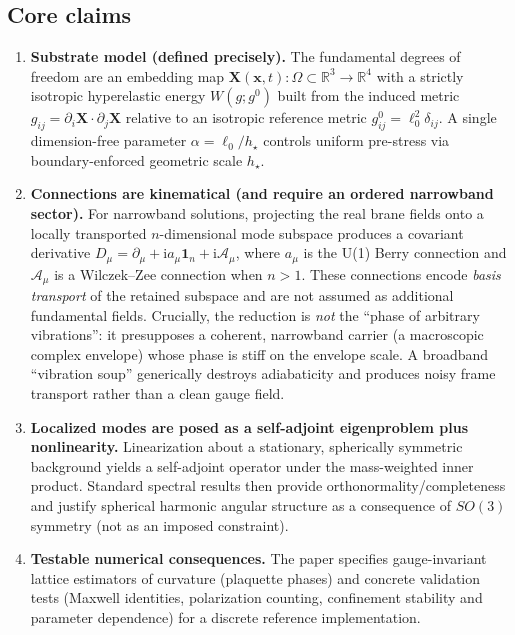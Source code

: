 \documentclass[11pt,a4paper]{article}
\providecommand{\ii}{\mathrm{i}}
\newcommand{\X}{\mathbf{X}}                 %
\newcommand{\x}{\mathbf{x}}                 %
\newcommand{\bbA}{\mathcal{A}}              %
\newcommand{\covD}{D}                       %
\begin{document}
\subsection*{Core claims}
\begin{enumerate}
  \item \textbf{Substrate model (defined precisely).} The fundamental degrees of freedom are an embedding map
        $\X(\x,t):\Omega\subset\mathbb{R}^3\to\mathbb{R}^4$ with a strictly isotropic hyperelastic energy
        $W(g;g^0)$ built from the induced metric $g_{ij}=\partial_i\X\cdot\partial_j\X$ relative to an isotropic
        reference metric $g^0_{ij}=\ell_0^2\delta_{ij}$. A single dimension-free parameter
        $\alpha=\ell_0/h_\star$ controls uniform pre-stress via boundary-enforced geometric scale $h_\star$.
  \item \textbf{Connections are kinematical (and require an ordered narrowband sector).} For narrowband solutions,
        projecting the real brane fields onto a locally transported $n$-dimensional mode subspace produces a covariant derivative
        $\covD_\mu=\partial_\mu+\ii a_\mu\mathbf{1}_n+\ii\bbA_\mu$, where $a_\mu$ is the U(1) Berry connection and
        $\bbA_\mu$ is a Wilczek--Zee connection when $n>1$. These connections encode \emph{basis transport} of the retained subspace
        and are not assumed as additional fundamental fields. Crucially, the reduction is \emph{not} the ``phase of arbitrary vibrations'':
        it presupposes a coherent, narrowband carrier (a macroscopic complex envelope) whose phase is stiff on the envelope scale.
        A broadband ``vibration soup'' generically destroys adiabaticity and produces noisy frame transport rather than a clean gauge field.
  \item \textbf{Localized modes are posed as a self-adjoint eigenproblem plus nonlinearity.} Linearization about a
        stationary, spherically symmetric background yields a self-adjoint operator under the mass-weighted
        inner product. Standard spectral results then provide orthonormality/completeness and justify spherical
        harmonic angular structure as a consequence of $SO(3)$ symmetry (not as an imposed constraint).
  \item \textbf{Testable numerical consequences.} The paper specifies gauge-invariant lattice estimators of
        curvature (plaquette phases) and concrete validation tests (Maxwell identities, polarization counting,
        confinement stability and parameter dependence) for a discrete reference implementation.
\end{enumerate}
\end{document}
